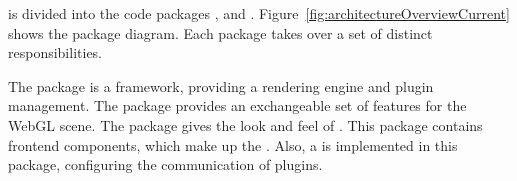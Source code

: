\documentclass[../ClassicThesis.tex]{subfiles}
\begin{document}
{\platener} is divided into the code packages {\convertify},
 and .
Figure~\ref{fig:architectureOverviewCurrent} shows the
package diagram. Each package takes over a set of distinct
responsibilities.


The {\convertify} package is a framework, providing a
rendering engine and plugin management. The 
package provides an exchangeable set of features for the
WebGL scene. The  package gives the look and
feel of {\platener}. This package contains frontend
components, which make up the {\userinterface}. Also, a
 is implemented in this package,
configuring the communication of plugins.









\end{document}
